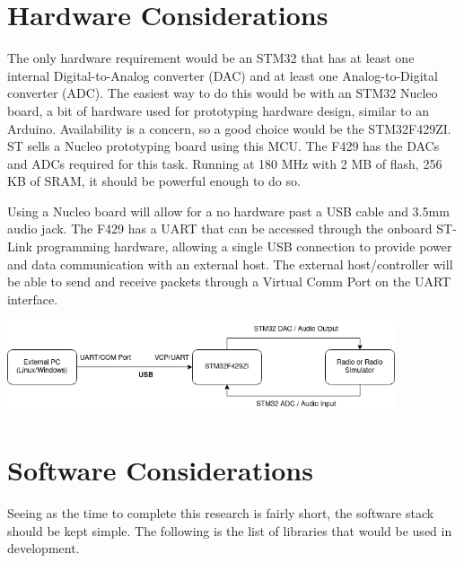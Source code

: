 \documentclass{article}[12pt,a4paper]
\begin{document}
\section*{Hardware Considerations}
The only hardware requirement would be an STM32 that has at least one internal Digital-to-Analog converter (DAC) and at least one Analog-to-Digital converter (ADC). The easiest way to do this would be with an STM32 Nucleo board, a bit of hardware used for prototyping hardware design, similar to an Arduino. Availability is a concern, so a good choice would be the STM32F429ZI. ST sells a Nucleo prototyping board using this MCU. The F429 has the DACs and ADCs required for this task. Running at 180 MHz with 2 MB of flash, 256 KB of SRAM, it should be powerful enough to do so.

Using a Nucleo board will allow for a no hardware past a USB cable and 3.5mm audio jack. The F429 has a UART that can be accessed through the onboard ST-Link programming hardware, allowing a single USB connection to provide power and data communication with an external host. The external host/controller will be able to send and receive packets through a Virtual Comm Port on the UART interface.

\begin{center}
  \includegraphics[width=4.5in]{images/hardware_outline.png}
\end{center}

\section*{Software Considerations}

Seeing as the time to complete this research is fairly short, the software stack should be kept simple. The following is the list of libraries that would be used in development.
\end{document}
